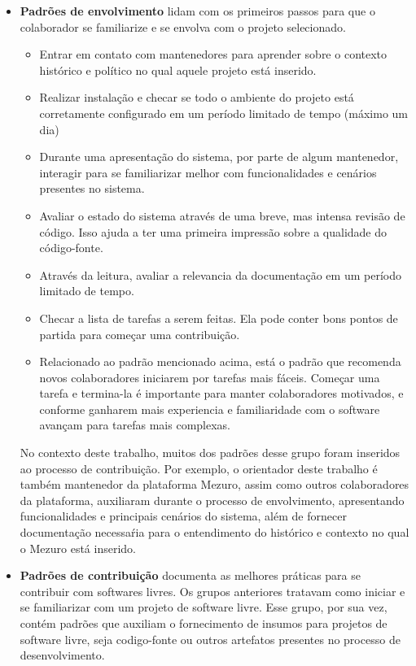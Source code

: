 \begin{itemize}
	\item \textbf{Padrões de envolvimento} lidam com os primeiros passos para que o colaborador se familiarize e se envolva com o projeto selecionado.

		\begin{itemize}
			\item Entrar em contato com mantenedores para aprender sobre o contexto 	histórico e político no qual aquele projeto está inserido.

			\item Realizar instalação e checar se todo o ambiente do projeto está 	corretamente configurado em um período limitado de tempo (máximo um dia)

			\item Durante uma apresentação do sistema,  por parte de algum mantenedor, interagir para se familiarizar melhor com funcionalidades e cenários presentes no sistema.

			\item Avaliar o estado do sistema através de uma breve, mas intensa revisão de código. Isso ajuda a ter uma primeira impressão sobre a 					qualidade do código-fonte.

			\item Através da leitura, avaliar a relevancia da documentação em um 			período limitado de tempo.

			\item Checar a lista de tarefas a serem feitas. Ela pode conter bons 			pontos de partida para começar uma contribuição.

			\item Relacionado ao padrão mencionado acima, está o padrão que recomenda novos colaboradores iniciarem por tarefas mais fáceis. Começar uma tarefa 			e termina-la é importante para manter colaboradores motivados, e conforme 			ganharem mais experiencia e familiaridade com o software avançam para 			tarefas mais complexas.
	\end{itemize}

No contexto deste trabalho, muitos dos padrões desse grupo foram inseridos ao processo de contribuição. Por exemplo, o orientador deste trabalho é também mantenedor da plataforma Mezuro, assim como outros colaboradores da plataforma, auxiliaram durante o processo de envolvimento, apresentando funcionalidades e principais cenários do sistema, além de fornecer documentação necessaŕia para o entendimento do histórico e contexto no qual o Mezuro está inserido.
	
	\item \textbf{Padrões de contribuição} documenta as melhores práticas para 	se contribuir com softwares livres. Os grupos anteriores tratavam como iniciar 	e se familiarizar com um projeto de software livre. Esse grupo, por sua vez, 		contém padrões que auxiliam o fornecimento de insumos para projetos de software livre, seja codigo-fonte ou outros artefatos presentes no processo de desenvolvimento.


\end{itemize}
